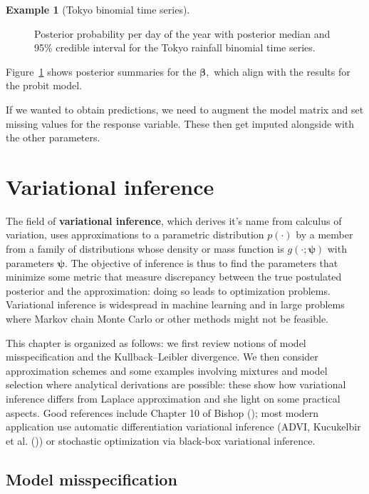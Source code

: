 \documentclass[
  11pt,
  letterpaper,
]{scrbook}
\theoremstyle{definition}
\theoremstyle{definition}
\newtheorem{example}{Example}[chapter]
\theoremstyle{definition}
\theoremstyle{plain}
\theoremstyle{plain}
\theoremstyle{plain}
\theoremstyle{remark}
\begin{document}
\begin{example}[Tokyo binomial time
series]
\begin{figure}[ht!]
{}

\caption{\label{fig-rainfall-inla}Posterior probability per day of the
year with posterior median and 95\% credible interval for the Tokyo
rainfall binomial time series.}

\end{figure}%

Figure~\ref{fig-rainfall-inla} shows posterior summaries for the
\(\boldsymbol{\beta},\) which align with the results for the probit
model.

If we wanted to obtain predictions, we need to augment the model matrix
and set missing values for the response variable. These then get imputed
alongside with the other parameters.

\end{example}


\chapter{Variational inference}\label{variational-inference}

The field of \textbf{variational inference}, which derives it's name
from calculus of variation, uses approximations to a parametric
distribution \(p(\cdot)\) by a member from a family of distributions
whose density or mass function is \(g(\cdot; \boldsymbol{\psi})\) with
parameters \(\boldsymbol{\psi}.\) The objective of inference is thus to
find the parameters that minimize some metric that measure discrepancy
between the true postulated posterior and the approximation: doing so
leads to optimization problems. Variational inference is widespread in
machine learning and in large problems where Markov chain Monte Carlo or
other methods might not be feasible.

This chapter is organized as follows: we first review notions of model
misspecification and the Kullback--Leibler divergence. We then consider
approximation schemes and some examples involving mixtures and model
selection where analytical derivations are possible: these show how
variational inference differs from Laplace approximation and she light
on some practical aspects. Good references include Chapter 10 of Bishop
(); most modern application use
automatic differentiation variational inference (ADVI, Kucukelbir et al.
()) or stochastic optimization via
black-box variational inference.

\section{Model misspecification}\label{model-misspecification}
\end{document}
